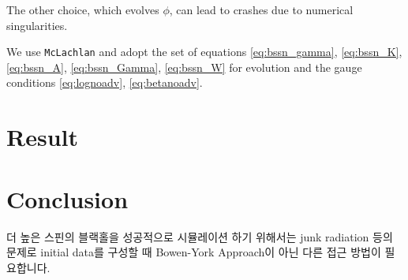 \documentclass[]{article}
\begin{document}
The other choice, which evolves $\phi$, can lead to crashes due to numerical singularities.

We use \texttt{McLachlan} \cite{Brown:2008sb, Kranc:web, McLachlan:web} and adopt the set of equations \eqref{eq:bssn_gamma}, \eqref{eq:bssn_K}, \eqref{eq:bssn_A}, \eqref{eq:bssn_Gamma}, \eqref{eq:bssn_W} for evolution and the gauge conditions \eqref{eq:lognoadv}, \eqref{eq:betanoadv}.

\section{Result}

\section{Conclusion}

더 높은 스핀의 블랙홀을 성공적으로 시뮬레이션 하기 위해서는 junk radiation 등의 문제로 initial data를 구성할 때 Bowen-York Approach이 아닌 다른 접근 방법이 필요합니다. 


\end{document}
